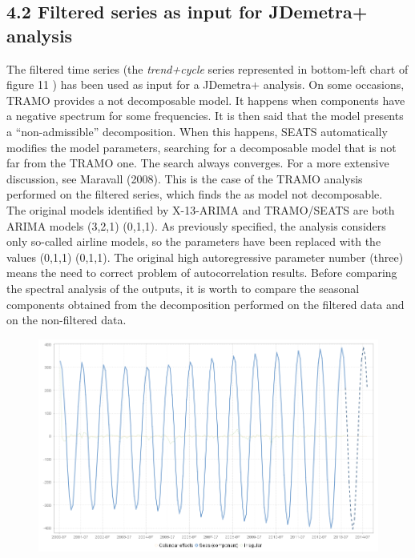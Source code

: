 \documentclass{article}
\begin{document}
\subsection*{\small 4.2 Filtered series as input for JDemetra+ analysis}
The filtered time series (the \textit{trend+cycle} series represented in bottom-left chart of figure 11 ) has been used as input for a JDemetra+ analysis. On some occasions, TRAMO provides a not decomposable model. It happens when components have a negative spectrum for some frequencies. It is then said that the model presents a “non-admissible” decomposition. When this happens, SEATS automatically modifies the model parameters, searching for a decomposable model that is not far from the TRAMO one. The search always converges. For a more extensive discussion, see Maravall (2008). This is the case of the TRAMO analysis performed on the filtered series, which finds the as model not decomposable.\\ {\color{green}The original models identified by X-13-ARIMA and TRAMO/SEATS are both ARIMA models (3,2,1) (0,1,1). As previously specified, the analysis considers only so-called airline models, so the parameters have been replaced with the values (0,1,1) (0,1,1). The original high autoregressive parameter number (three) means the need to correct problem of autocorrelation results.} Before comparing the spectral analysis of the outputs, it is worth to compare the seasonal components obtained from the decomposition performed on the filtered data and on the non-filtered data.
\begin{figure}[H]
    \includegraphics[width=\textwidth]{../images/capitolo4/X13_seas_cmp_filtered.jpg}
\end{figure}
\end{document}
